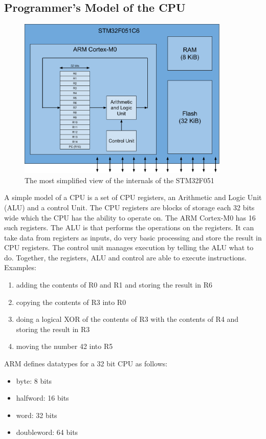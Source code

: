 \subsection{Programmer's Model of the CPU}
\begin{figure}[t]
  \centering
  \includegraphics[width=0.9\textwidth]{./week1/programmers_model_v0.pdf}
  \caption{The most simplified view of the internals of the STM32F051}
\end{figure}
A simple model of a CPU is a set of CPU registers, an Arithmetic and Logic Unit (ALU) and a control Unit. The CPU registers are blocks of storage each 32 bits wide which the CPU has the ability to operate on. The ARM Cortex-M0 has 16 such registers. 
The ALU is that performs the operations on the registers. It can take data from registers as inputs, do very basic processing and store the result in CPU registers. 
The control unit manages execution by telling the ALU what to do. Together, the registers, ALU and control are able to execute instructions. 
Examples:
\begin{enumerate}
  \item adding the contents of R0 and R1 and storing the result in R6
  \item copying the contents of R3 into R0
  \item doing a logical XOR of the contents of R3 with the contents of R4 and storing the result in R3
  \item moving the number 42 into R5
\end{enumerate}

ARM defines datatypes for a 32 bit CPU as follows:
\begin{itemize}
  \item byte: 8 bits
  \item halfword: 16 bits
  \item word: 32 bits
  \item doubleword: 64 bits
\end{itemize}

